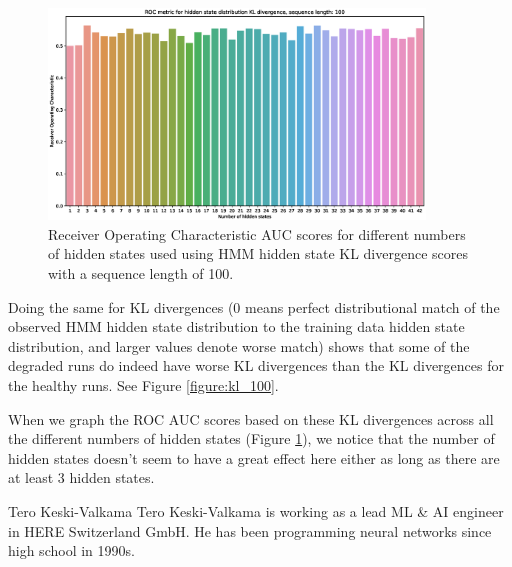 \documentclass[journal]{IEEEtran}
\begin{document}
\begin{figure}[tb]
 \centering
 \includegraphics[width=10cm,keepaspectratio=true]{./roc_kl_score_100.eps}
 \caption{Receiver Operating Characteristic AUC scores for different numbers of hidden states used using HMM hidden state KL divergence scores with a sequence length of 100.}
 \label{figure:roc_kl_100}
\end{figure}

Doing the same for KL divergences (0 means perfect distributional match of the observed HMM hidden state distribution to the training data hidden state distribution, and larger values denote worse match) shows that some of the degraded runs do indeed have worse KL divergences than the KL divergences for the healthy runs. See Figure \ref{figure:kl_100}.

When we graph the ROC AUC scores based on these KL divergences across all the different numbers of hidden states (Figure \ref{figure:roc_kl_100}), we notice that the number of hidden states doesn't seem to have a great effect here either as long as there are at least 3 hidden states.

\appendices




\begin{IEEEbiography}{Tero Keski-Valkama}
Tero Keski-Valkama is working as a lead ML \& AI engineer in HERE Switzerland GmbH. He has been programming neural networks since high school in 1990s.
\end{IEEEbiography}
\end{document}

